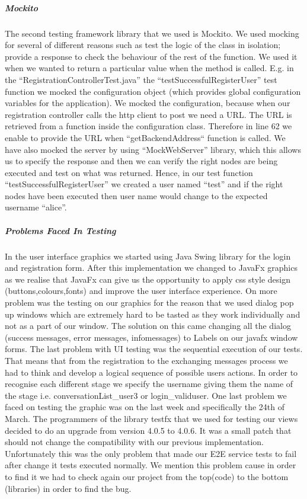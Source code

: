 \documentclass[11pt,a4paper]{report}
\begin{document}
\subparagraph{Mockito}
The second testing framework library that we used is Mockito. We used mocking for several of different reasons such as test the logic of the class in isolation; provide a response to check the behaviour of the rest of the function. We used it when we wanted to return a particular value when the method is called. E.g. in the “RegistrationControllerTest.java” the “testSuccessfulRegisterUser” test function we mocked the configuration object (which provides global configuration variables for the application). We mocked the configuration, because when our registration controller calls the http client to post we need a URL. The URL is retrieved from a function inside the configuration class. Therefore in line 62 we enable to provide the URL when “getBackendAddress“ function is called. We have also mocked the server by using “MockWebServer” library, which this allows us to specify the response and then we can verify the right nodes are being executed and test on what was returned. Hence, in our test function “testSuccessfulRegisterUser” we created a user named “test” and if the right nodes have been executed then user name would change to the expected username “alice”.

\subparagraph{Problems Faced In Testing}
 In the user interface graphics we started using Java Swing library for the login and registration form. After this implementation we changed to JavaFx graphics as we realise that JavaFx can give us the opportunity to apply css style design (buttons,colours,fonts) and improve the user interface experience. On more problem was the testing on our graphics for the reason that we used dialog pop up windows which are extremely hard to be tasted as they work individually and not as a part of our window. The solution on this came changing all the dialog (success messages, error messages, infomessages) to Labels on our javafx window forms. The last problem with UI testing was the sequential execution of our tests. That means that from the registration to the exchanging messages process we had to think and develop a logical sequence of possible users actions. In order to recognise each different stage we specify the username giving them the name of the stage i.e. conversationList\_user3 or login\_validuser. One last problem we faced on testing the graphic was on the last week and specifically the 24th of March. The programmers of the library testfx that we used for testing our views decided to do an upgrade from version 4.0.5 to 4.0.6. It was a small patch that should not change the compatibility with our previous implementation. Unfortunately this was the only problem that made our E2E service tests to fail after change it tests executed normally. We mention this problem cause in order to find it we had to check again our project from the top(code) to the bottom (libraries) in order to find the bug. 
\end{document}
